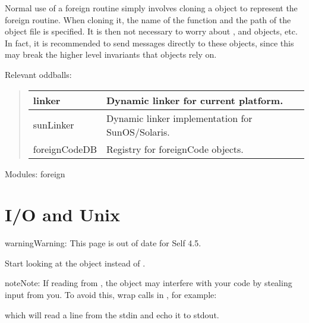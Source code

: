 \documentclass[letterpaper,10pt,english]{sphinxmanual}
\begin{document}
Normal use of a foreign routine simply involves cloning a  object to represent the foreign
routine. When cloning it, the name of the function and the path of the object file is specified.
It is then not necessary to worry about ,  and  objects, etc. In fact, it is
recommended  to send messages directly to these objects, since this may break the higher level
invariants that  objects rely on.

Relevant oddballs:
\begin{quote}

\noindent\begin{tabulary}{\linewidth}{|L|L|}
\hline

linker
&
Dynamic linker for current platform.
\\
\hline
sunLinker
&
Dynamic linker implementation for SunOS/Solaris.
\\
\hline
foreignCodeDB
&
Registry for foreignCode objects.
\\
\hline\end{tabulary}

\end{quote}

Modules: foreign


\section{I/O and Unix}
\label{\detokenize{unix:i-o-and-unix}}\label{\detokenize{unix::doc}}
\begin{sphinxVerbatim}[commandchars=\\\{\}]
             
\end{sphinxVerbatim}

\begin{sphinxadmonition}{warning}{Warning:}
This page is out of date for Self 4.5.

Start looking at the object  instead of .
\end{sphinxadmonition}

\begin{sphinxadmonition}{note}{Note:}
If reading from , the  object may interfere with your
code by stealing input from you.  To avoid this, wrap calls in
, for example:

\begin{sphinxVerbatim}[commandchars=\\\{\}]
  \PYG{p}{[}    \PYG{p}{]}
\end{sphinxVerbatim}

which will read a line from the stdin and echo it to stdout.
\end{sphinxadmonition}
\end{document}

